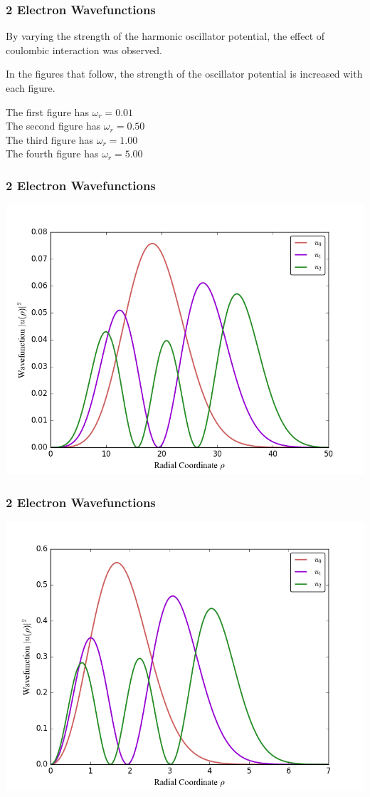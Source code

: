 \documentclass[10pt,xcolor={x11names}]{beamer}
\begin{document}
		\begin{frame} \frametitle{2 Electron Wavefunctions}
			By varying the strength of the harmonic oscillator potential, the effect of coulombic interaction was observed.

			In the figures that follow, the strength of the oscillator potential is increased with each figure.

			The first figure has $\omega_r = 0.01$ \\
			The second figure has $\omega_r = 0.50$ \\
			The third figure has $\omega_r = 1.00$ \\
			The fourth figure has $\omega_r = 5.00$ 
		\end{frame}

		\begin{frame} \frametitle{2 Electron Wavefunctions}
			\begin{center}
    		\includegraphics[width=.85\textwidth]{Code/WavefunctionOmega0p01.png}
    		\end{center}
		\end{frame}

		\begin{frame} \frametitle{2 Electron Wavefunctions}
			\begin{center}
    		\includegraphics[width=.85\textwidth]{Code/WavefunctionOmega0p50.png}
    		\end{center}
		\end{frame}
\end{document}
